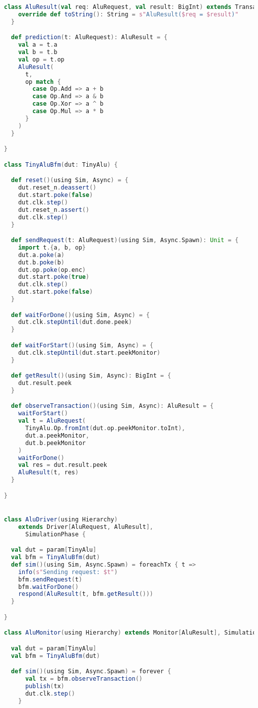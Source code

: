 \begin{lstlisting}[language=scala, captionpos=b, caption=Test code for the tiny ALU.,label=lst:alu_test]
  class AluResult(val req: AluRequest, val result: BigInt) extends Transaction {
    override def toString(): String = s"AluResult($req = $result)"
  }

  def prediction(t: AluRequest): AluResult = {
    val a = t.a
    val b = t.b
    val op = t.op
    AluResult(
      t,
      op match {
        case Op.Add => a + b
        case Op.And => a & b
        case Op.Xor => a ^ b
        case Op.Mul => a * b
      }
    )
  }

}

class TinyAluBfm(dut: TinyAlu) {

  def reset()(using Sim, Async) = {
    dut.reset_n.deassert()
    dut.start.poke(false)
    dut.clk.step()
    dut.reset_n.assert()
    dut.clk.step()
  }

  def sendRequest(t: AluRequest)(using Sim, Async.Spawn): Unit = {
    import t.{a, b, op}
    dut.a.poke(a)
    dut.b.poke(b)
    dut.op.poke(op.enc)
    dut.start.poke(true)
    dut.clk.step()
    dut.start.poke(false)
  }

  def waitForDone()(using Sim, Async) = {
    dut.clk.stepUntil(dut.done.peek)
  }

  def waitForStart()(using Sim, Async) = {
    dut.clk.stepUntil(dut.start.peekMonitor)
  }

  def getResult()(using Sim, Async): BigInt = {
    dut.result.peek
  }

  def observeTransaction()(using Sim, Async): AluResult = {
    waitForStart()
    val t = AluRequest(
      TinyAlu.Op.fromInt(dut.op.peekMonitor.toInt),
      dut.a.peekMonitor,
      dut.b.peekMonitor
    )
    waitForDone()
    val res = dut.result.peek
    AluResult(t, res)
  }

}


class AluDriver(using Hierarchy)
    extends Driver[AluRequest, AluResult],
      SimulationPhase {

  val dut = param[TinyAlu]
  val bfm = TinyAluBfm(dut)
  def sim()(using Sim, Async.Spawn) = foreachTx { t =>
    info(s"Sending request: $t")
    bfm.sendRequest(t)
    bfm.waitForDone()
    respond(AluResult(t, bfm.getResult()))
  }

}

class AluMonitor(using Hierarchy) extends Monitor[AluResult], SimulationPhase {

  val dut = param[TinyAlu]
  val bfm = TinyAluBfm(dut)

  def sim()(using Sim, Async.Spawn) = forever {
      val tx = bfm.observeTransaction()
      publish(tx)
      dut.clk.step()
    }


\end{lstlisting}

